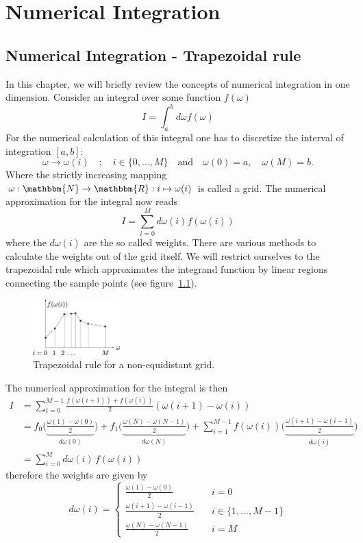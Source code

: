 \chapter{Numerical Integration}\label{chapter:numerical_integraion}
\section{Numerical Integration - Trapezoidal rule}
In this chapter, we will briefly review the concepts of numerical integration in one dimension. Consider an integral over some function $f(\omega)$
\begin{equation}
	I=\int_a^b d\omega f(\omega)
\end{equation}
For the numerical calculation of this integral one has to discretize the interval of integration $[a,b]$:
\[
	\omega \to \omega(i) \quad;\quad i\in\{0,\dots,M\}\quad\text{and}\quad \omega(0)=a,\quad \omega(M)=b.
\]
Where the strictly increasing mapping $\omega: \mathbbm{N} \to \mathbbm{R}: i \mapsto \omega(i)$ is called a grid. The numerical approximation for the integral now reads
\begin{equation} 
	I=\sum_{i=0}^M d\omega(i) f(\omega(i))
\end{equation}
where the $d\omega(i)$ are the so called weights. There are various methods to calculate the weights out of the grid itself. We will restrict ourselves to the trapezoidal rule which approximates the integrand function by linear regions connecting the sample points (see figure~\ref{fig:trapezoidal_rule}).
\begin{figure}[ht]
	\centering
	\includegraphics[width=0.3\textwidth]{pics/trapez.eps}
	\caption{Trapezoidal rule for a non-equidistant grid.}
	\label{fig:trapezoidal_rule}
\end{figure}

The numerical approximation for the integral is then
\begin{align*}
	I&=\sum_{i=0}^{M-1} \frac{f(\omega(i+1)) + f(\omega(i))}{2} (\omega(i+1)-\omega(i)) \\
	&=f_0\biggl( \underbrace{\frac{\omega(1)-\omega(0)}{2}}_{d\omega(0)}\biggr) + f_1 \biggl( \underbrace{\frac{\omega(N)-\omega(N-1)}{2}}_{d\omega(N)}\biggr) + \sum_{i=1}^{M-1} f(\omega(i)) \biggl( \underbrace{\frac{\omega(i+1)-\omega(i-1)}{2}}_{d\omega(i)}\biggr)\\
	&=\sum_{i=0}^{M} d\omega(i)\,f(\omega(i))
\end{align*}
therefore the weights are given by
\[
	d\omega(i)=\begin{cases}
		\frac{\omega(1)-\omega(0)}{2} \quad &i=0\\
		\frac{\omega(i+1)-\omega(i-1)}{2} \quad &i\in \{1,\dots,M-1\}  \\
		\frac{\omega(N)-\omega(N-1)}{2} \quad &i=M
	\end{cases}
\]

